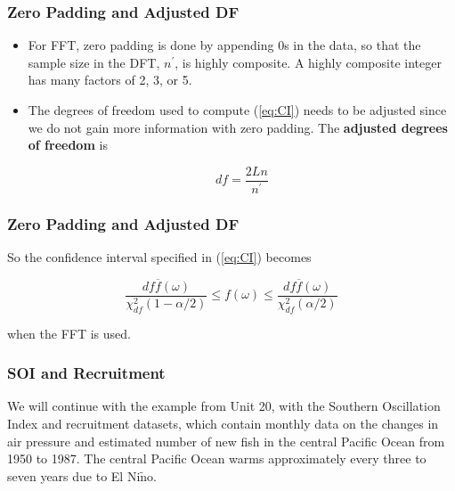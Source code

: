 \documentclass[%
xcolor=pdftex]{beamer}
\begin{document}
\begin{frame} 
\frametitle{Zero Padding and Adjusted DF}


\begin{itemize}

\item For FFT, zero padding is done by appending 0s in the data, so that the sample size in the DFT, $n^\prime$, is highly composite. A highly composite integer has many factors of 2, 3, or 5. 

\item The degrees of freedom used to compute (\ref{eq:CI}) needs to be adjusted since we do not gain more information with zero padding. The \textbf{adjusted degrees of freedom} is 

\begin{equation}
df = \frac{2Ln}{n^\prime}
\end{equation}

\end{itemize}

\end{frame}

\begin{frame} 
\frametitle{Zero Padding and Adjusted DF}


So the confidence interval specified in (\ref{eq:CI}) becomes

\begin{equation} \label{eq:CI0}
\frac{df  \overline{f}(\omega)}{{\chi_{df}^2(1-\alpha/2)}} \leq f(\omega) \leq \frac{df  \overline{f}(\omega)}{{\chi_{df}^2(\alpha/2)}}
\end{equation}

when the FFT is used.


\end{frame}

\begin{frame}
\frametitle{SOI and Recruitment}

We will continue with the example from Unit 20, with the Southern Oscillation Index and recruitment datasets, which contain monthly data on the changes in air pressure and estimated number of new fish in the central Pacific Ocean from 1950 to 1987. The central Pacific Ocean warms approximately every three to seven years due to El Ni$\tilde{\text{n}}$o.

\end{frame}
\end{document}
